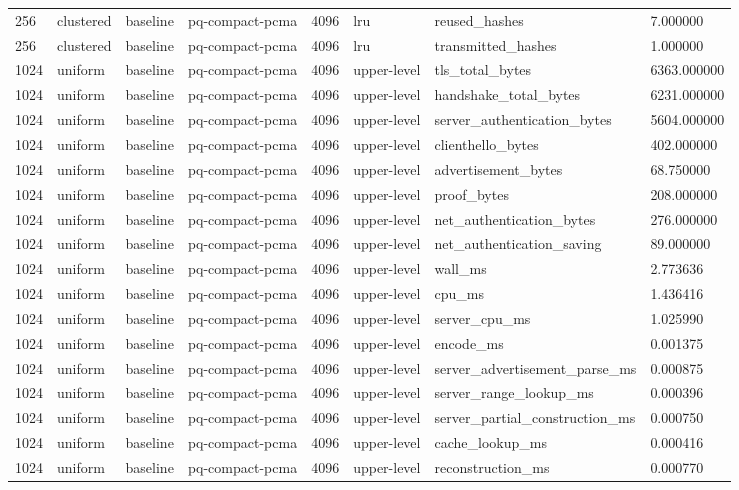 \begin{tabular}{llllllll}
256 & clustered & baseline & pq-compact-pcma & 4096 & lru & reused\_hashes & 7.000000 \\
256 & clustered & baseline & pq-compact-pcma & 4096 & lru & transmitted\_hashes & 1.000000 \\
1024 & uniform & baseline & pq-compact-pcma & 4096 & upper-level & tls\_total\_bytes & 6363.000000 \\
1024 & uniform & baseline & pq-compact-pcma & 4096 & upper-level & handshake\_total\_bytes & 6231.000000 \\
1024 & uniform & baseline & pq-compact-pcma & 4096 & upper-level & server\_authentication\_bytes & 5604.000000 \\
1024 & uniform & baseline & pq-compact-pcma & 4096 & upper-level & clienthello\_bytes & 402.000000 \\
1024 & uniform & baseline & pq-compact-pcma & 4096 & upper-level & advertisement\_bytes & 68.750000 \\
1024 & uniform & baseline & pq-compact-pcma & 4096 & upper-level & proof\_bytes & 208.000000 \\
1024 & uniform & baseline & pq-compact-pcma & 4096 & upper-level & net\_authentication\_bytes & 276.000000 \\
1024 & uniform & baseline & pq-compact-pcma & 4096 & upper-level & net\_authentication\_saving & 89.000000 \\
1024 & uniform & baseline & pq-compact-pcma & 4096 & upper-level & wall\_ms & 2.773636 \\
1024 & uniform & baseline & pq-compact-pcma & 4096 & upper-level & cpu\_ms & 1.436416 \\
1024 & uniform & baseline & pq-compact-pcma & 4096 & upper-level & server\_cpu\_ms & 1.025990 \\
1024 & uniform & baseline & pq-compact-pcma & 4096 & upper-level & encode\_ms & 0.001375 \\
1024 & uniform & baseline & pq-compact-pcma & 4096 & upper-level & server\_advertisement\_parse\_ms & 0.000875 \\
1024 & uniform & baseline & pq-compact-pcma & 4096 & upper-level & server\_range\_lookup\_ms & 0.000396 \\
1024 & uniform & baseline & pq-compact-pcma & 4096 & upper-level & server\_partial\_construction\_ms & 0.000750 \\
1024 & uniform & baseline & pq-compact-pcma & 4096 & upper-level & cache\_lookup\_ms & 0.000416 \\
1024 & uniform & baseline & pq-compact-pcma & 4096 & upper-level & reconstruction\_ms & 0.000770 \\

\end{tabular}
